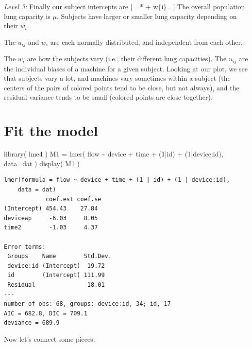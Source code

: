 \documentclass[
  letterpaper,
  DIV=11,
  numbers=noendperiod]{scrreprt}
\newenvironment{Shaded}{}{}
\newcommand{\AttributeTok}[1]{\textcolor[rgb]{0.49,0.56,0.16}{#1}}
\newcommand{\DecValTok}[1]{\textcolor[rgb]{0.25,0.63,0.44}{#1}}
\newcommand{\FunctionTok}[1]{\textcolor[rgb]{0.02,0.16,0.49}{#1}}
\newcommand{\NormalTok}[1]{#1}
\newcommand{\OtherTok}[1]{\textcolor[rgb]{0.00,0.44,0.13}{#1}}
\newcommand{\SpecialCharTok}[1]{\textcolor[rgb]{0.25,0.44,0.63}{#1}}
\begin{document}
\emph{Level 3:} Finally our subject intercepts are {[}  =*
\mu + w\{i\} . {]} The overall population lung capacity is \(\mu\).
Subjects have larger or smaller lung capacity depending on their
\(w_{i}\).

The \(u_{ij}\) and \(w_i\) are each normally distributed, and
independent from each other.

The \(w_i\) are how the subjects vary (i.e., their different lung
capacities). The \(u_{ij}\) are the individual biases of a machine for a
given subject. Looking at our plot, we see that subjects vary a lot, and
machines vary sometimes within a subject (the centers of the pairs of
colored points tend to be close, but not always), and the residual
variance tends to be small (colored points are close together).

\section{Fit the model}\label{fit-the-model}

\begin{Shaded}
\begin{Highlighting}[]
\FunctionTok{library}\NormalTok{( lme4 )}
\NormalTok{M1 }\OtherTok{=} \FunctionTok{lmer}\NormalTok{( flow }\SpecialCharTok{\textasciitilde{}}\NormalTok{ device }\SpecialCharTok{+}\NormalTok{ time }\SpecialCharTok{+}\NormalTok{ (}\DecValTok{1}\SpecialCharTok{|}\NormalTok{id) }\SpecialCharTok{+}\NormalTok{ (}\DecValTok{1}\SpecialCharTok{|}\NormalTok{device}\SpecialCharTok{:}\NormalTok{id), }\AttributeTok{data=}\NormalTok{dat )}
\FunctionTok{display}\NormalTok{( M1 )}
\end{Highlighting}
\end{Shaded}

\begin{verbatim}
lmer(formula = flow ~ device + time + (1 | id) + (1 | device:id), 
    data = dat)
            coef.est coef.se
(Intercept) 454.43    27.84 
devicewp     -6.03     8.05 
time2        -1.03     4.37 

Error terms:
 Groups    Name        Std.Dev.
 device:id (Intercept)  19.72  
 id        (Intercept) 111.99  
 Residual               18.01  
---
number of obs: 68, groups: device:id, 34; id, 17
AIC = 682.8, DIC = 709.1
deviance = 689.9 
\end{verbatim}

Now let's connect some pieces:
\end{document}
